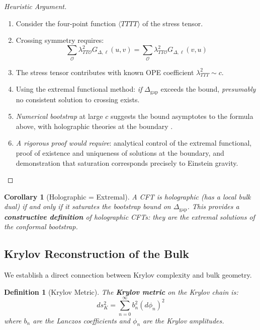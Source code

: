\documentclass[12pt,a4paper]{article}
\newtheorem{definition}[theorem]{Definition}
\newtheorem{corollary}[theorem]{Corollary}
\begin{document}
\begin{proof}[Heuristic Argument]
\begin{enumerate}
    \item Consider the four-point function $\langle TTTT \rangle$ of the stress tensor.
    
    \item Crossing symmetry requires:
    \begin{equation}
    \sum_{\mathcal{O}} \lambda_{TT\mathcal{O}}^2 G_{\Delta, \ell}(u, v) = \sum_{\mathcal{O}} \lambda_{TT\mathcal{O}}^2 G_{\Delta, \ell}(v, u)
    \end{equation}
    
    \item The stress tensor contributes with known OPE coefficient $\lambda_{TTT}^2 \sim c$.
    
    \item Using the extremal functional method: \textit{if} $\Delta_{\text{gap}}$ exceeds the bound, \textit{presumably} no consistent solution to crossing exists.
    
    \item \textit{Numerical bootstrap} at large $c$ suggests the bound asymptotes to the formula above, with holographic theories at the boundary \cite{poland2019}.
    
    \item \textit{A rigorous proof would require}: analytical control of the extremal functional, proof of existence and uniqueness of solutions at the boundary, and demonstration that saturation corresponds precisely to Einstein gravity.
\end{enumerate}
\end{proof}

\begin{corollary}[Holographic = Extremal]
A CFT is holographic (has a local bulk dual) if and only if it saturates the bootstrap bound on $\Delta_{\text{gap}}$. This provides a \textbf{constructive definition} of holographic CFTs: they are the extremal solutions of the conformal bootstrap.
\end{corollary}

\subsection{Krylov Reconstruction of the Bulk}

We establish a direct connection between Krylov complexity and bulk geometry.

\begin{definition}[Krylov Metric]
The \textbf{Krylov metric} on the Krylov chain is:
\begin{equation}
ds^2_K = \sum_{n=0}^\infty b_n^2 (d\phi_n)^2
\end{equation}
where $b_n$ are the Lanczos coefficients and $\phi_n$ are the Krylov amplitudes.
\end{definition}
\end{document}
